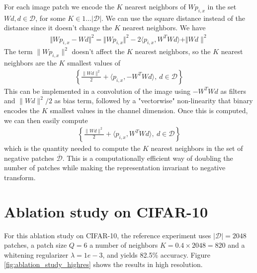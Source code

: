 \documentclass{article} %
\begin{document}
For each image patch we encode the $K$ nearest neighbors of $W p_{i,x}$ in the set $Wd, d \in \mathcal{D}$, for some $ K \in 1 \ldots|\mathcal{D}| $.
We can use the square distance instead of the distance since it doesn't change the $K$ nearest neighbors.
We have 
\begin{align*}
    \Vert Wp_{i,x} - Wd \Vert^2 = \Vert Wp_{i,x} \Vert^2 - 2 \langle p_{i,x}, W^T W d \rangle + \Vert Wd\|^2
\end{align*}
The term $\|Wp_{i,x}\|^2$ doesn't affect the $K$ nearest neighbors, so the $K$ nearest neighbors are the $K$ smallest values of
\begin{align*}
        \left \lbrace \frac{\|Wd \|^2}{2} + \langle p_{i,x}, -W^T W d \rangle, \ d \in \mathcal{D} \right \rbrace
\end{align*}
This can be implemented in a convolution of the image using $-W^T W d$ as filters and $\|Wd \|^2 / 2$ as bias term, followed by a "vectorwise" non-linearity that binary encodes the $K$ smallest values in the channel dimension.
Once this is computed, we can then easily compute 
\begin{align*}
        \left \lbrace \frac{\|Wd \|^2}{2} + \langle p_{i,x}, W^T W d \rangle, \ d \in \mathcal{D} \right \rbrace
\end{align*}
which is the quantity needed to compute the $K$ nearest neighbors in the set of negative patches $\overline{\mathcal{D}}$.
This is a computationally efficient way of doubling the number of patches while making the representation invariant to negative transform.


\section{Ablation study on CIFAR-10}

For this ablation study on CIFAR-10, the reference experiment uses  $|\mathcal{D}|=2048$ patches, a patch size $Q=6$ a number of neighbors $K=0.4\times 2048 = 820$ and a whitening regularizer $\lambda=1e-3$, and yields 82.5\% accuracy.
Figure \ref{fig:ablation_study_highres} shows the results in high resolution.
\end{document}
